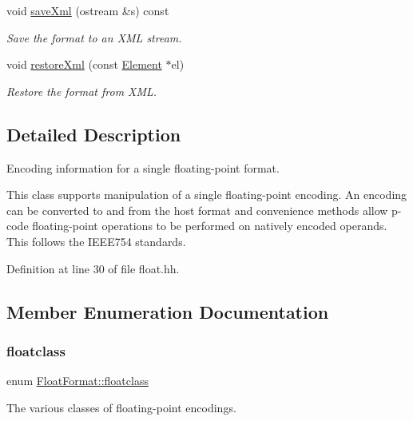 \begin{DoxyCompactItemize}
void \mbox{\hyperlink{class_float_format_adc679e89dcd8c63b0b9cc08f3464ba1a}{save\+Xml}} (ostream \&s) const
\begin{DoxyCompactList}\small\item\em Save the format to an X\+ML stream. \end{DoxyCompactList}\item 
void \mbox{\hyperlink{class_float_format_aa6e0b189a1a66251b200fcf829d98356}{restore\+Xml}} (const \mbox{\hyperlink{class_element}{Element}} $\ast$el)
\begin{DoxyCompactList}\small\item\em Restore the format from X\+ML. \end{DoxyCompactList}\end{DoxyCompactItemize}


\subsection{Detailed Description}
Encoding information for a single floating-\/point format. 

This class supports manipulation of a single floating-\/point encoding. An encoding can be converted to and from the host format and convenience methods allow p-\/code floating-\/point operations to be performed on natively encoded operands. This follows the I\+E\+E\+E754 standards. 

Definition at line 30 of file float.\+hh.



\subsection{Member Enumeration Documentation}
\mbox{\label{class_float_format_a18acf57dc2fa19c8afe87fa1f61a0481}} 
\subsubsection{\texorpdfstring{floatclass}{floatclass}}
{\footnotesize\ttfamily enum \mbox{\hyperlink{class_float_format_a18acf57dc2fa19c8afe87fa1f61a0481}{Float\+Format\+::floatclass}}}



The various classes of floating-\/point encodings. 

